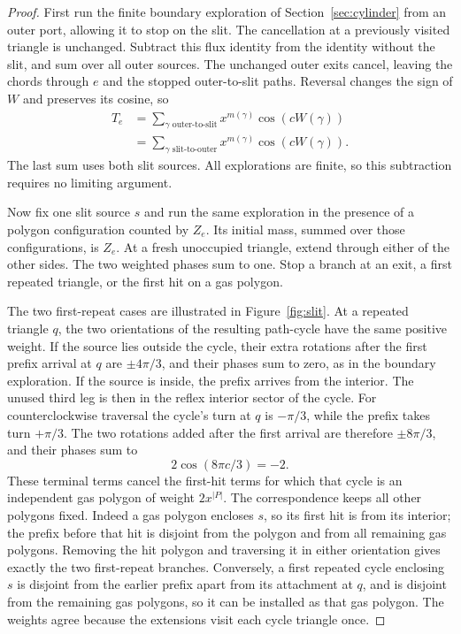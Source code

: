 \begin{proof}
First run the finite boundary exploration of Section~\ref{sec:cylinder}
from an outer port, allowing it to stop on the slit. The cancellation
at a previously visited triangle is unchanged. Subtract this flux
identity from the identity without the slit, and sum over all outer
sources. The unchanged outer exits cancel, leaving the chords through
$e$ and the stopped outer-to-slit paths. Reversal changes the sign of
$W$ and preserves its cosine, so
\begin{equation}\label{eq:slit-comparison}
 \begin{split}
 T_e&=\sum_{\gamma\text{ outer-to-slit}}
                x^{m(\gamma)}\cos(cW(\gamma))\\
 &=\sum_{\gamma\text{ slit-to-outer}}
                x^{m(\gamma)}\cos(cW(\gamma)).
 \end{split}
\end{equation}
The last sum uses both slit sources. All explorations are finite, so
this subtraction requires no limiting argument.

Now fix one slit source $s$ and run the same exploration in the
presence of a polygon configuration counted by $Z_e$. Its initial
mass, summed over those configurations, is $Z_e$. At a fresh
unoccupied triangle, extend through either of the other sides. The
two weighted phases sum to one. Stop a branch at an exit, a first
repeated triangle, or the first hit on a gas polygon.

The two first-repeat cases are illustrated in Figure~\ref{fig:slit}.
At a repeated triangle $q$, the two orientations of the resulting
path-cycle have the same positive weight. If the source lies outside
the cycle, their extra rotations after the first prefix arrival at
$q$ are $\pm4\pi/3$, and their phases sum to zero, as in the boundary
exploration. If the source is inside, the prefix arrives from the
interior. The unused third leg is then in the reflex interior sector
of the cycle. For counterclockwise traversal the cycle's turn at $q$
is $-\pi/3$, while the prefix takes turn $+\pi/3$. The two rotations
added after the first arrival are therefore $\pm8\pi/3$, and their
phases sum to
\[
 2\cos(8\pi c/3)=-2.
\]
These terminal terms cancel the first-hit terms for which that cycle
is an independent gas polygon of weight $2x^{|P|}$. The correspondence
keeps all other polygons fixed. Indeed a gas polygon encloses $s$,
so its first hit is from its interior; the prefix before that hit is
disjoint from the polygon and from all remaining gas polygons.
Removing the hit polygon and traversing it in either orientation
gives exactly the two first-repeat branches. Conversely, a first
repeated cycle enclosing $s$ is disjoint from the earlier prefix apart
from its attachment at $q$, and is disjoint from the remaining gas
polygons, so it can be installed as that gas polygon.
The weights agree because the extensions visit each cycle triangle once.


\end{proof}
